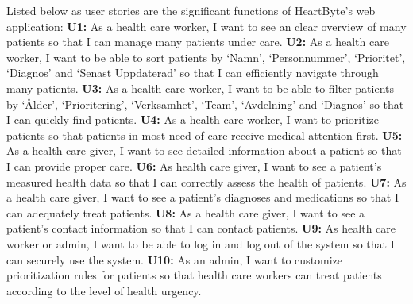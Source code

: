 \documentclass{scrreprt}
\begin{document}
Listed below as user stories are the significant functions of HeartByte’s web application:
\newline
\newline
\textbf{U1:} As a health care worker, I want to see an clear overview of many patients so that I can manage many patients under care.
\newline
\newline
\textbf{U2:} As a health care worker, I want to be able to sort patients by ‘Namn’, ‘Personnummer’, ‘Prioritet’, ‘Diagnos’ and ‘Senast Uppdaterad’ so that I can efficiently navigate through many patients.
\newline
\newline
\textbf{U3:} As a health care worker, I want to be able to filter patients by ‘Ålder’, ‘Prioritering’, ‘Verksamhet’, ‘Team’, ‘Avdelning’ and ‘Diagnos’ so that I can quickly find patients.
\newline
\newline
\textbf{U4:} As a health care worker, I want to prioritize patients so that patients in most need of care receive medical attention first.
\newline
\newline
\textbf{U5:} As a health care giver, I want to see detailed information about a patient so that I can provide proper care.
\newline
\newline
\textbf{U6:} As health care giver, I want to see a patient’s measured health data so that I can correctly assess the health of patients.
\newline
\newline
\textbf{U7:} As a health care giver, I want to see a patient’s diagnoses and medications so that I can adequately treat patients. 
\newline
\newline
\textbf{U8:} As a health care giver, I want to see a patient's contact information so that I can contact patients.
\newline
\newline
\textbf{U9:} As health care worker or admin, I want to be able to log in and log out of the system so that I can securely use the system.
\newline
\newline
\textbf{U10:} As an admin, I want to customize prioritization rules for patients so that health care workers can treat patients according to the level of health urgency. 
\newline
\end{document}
